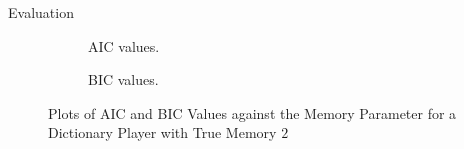 \documentclass[final]{beamer}
\begin{document}
{\begin{frame}{}
\begin{center}
\begin{columns}[t]
\begin{column}{0.32\textwidth}
\begin{block}{\huge Evaluation}
\begin{figure}
	\begin{subfigure}[b]{.45\textwidth}
\begin{center}
		\caption{AIC values.}
\end{center}
	\end{subfigure}
\hspace{1cm}
	\begin{subfigure}[b]{.45\textwidth}
\begin{center}
		\caption{BIC values.}
\end{center}
	\end{subfigure}
\hfill
	\caption{Plots of AIC and BIC Values against the Memory Parameter for a Dictionary Player with True Memory $2$}	
\end{figure}
    \end{block}


\end{column}
\end{columns}
\end{center}
\end{frame}}
\end{document}
